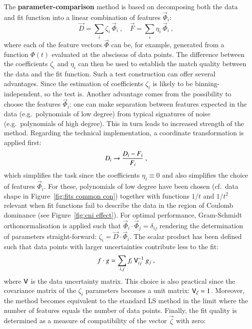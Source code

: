 The {\bf parameter-comparison} method is based on decomposing both the data and fit function into a linear combination of features $\vec\Phi_i$: 
\begin{equation}
\label{eq:parcmp decomposition}
	\vec D = \sum_i \zeta_i\ \vec\Phi_i\ ,\quad
	\vec F = \sum_i \eta_i\ \vec\Phi_i\ ,
\end{equation}
where each of the feature vectors $\vec\Phi$ can be, for example, generated from a function $\Phi(t)$ evaluated at the abscissas of data points. The difference between the coefficients $\zeta_i$ and $\eta_i$ can then be used to establish the match quality between the data and the fit function. Such a test construction can offer several advantages. Since the estimation of coefficients $\zeta_i$ is likely to be binning-independent, so the test is. Another advantage comes from the possibility to choose the features $\vec\Phi_i$: one can make separation between features expected in the data (e.g.~polynomials of low degree) from typical signatures of noise (e.g.~polynomials of high degree). This in turn leads to increased strength of the method. Regarding the technical implementation, a coordinate transformation is applied first:
\begin{equation}
\label{eq:parcmp transform}
	D_i \rightarrow {D_i - F_i\over F_i}\ ,
\end{equation}
which simplifies the task since the coefficients $\eta_i \equiv 0$ and also simplifies the choice of features $\vec\Phi_i$. For these, polynomials of low degree have been chosen (cf.~data shape in Figure~\ref{fig:fits common con}) together with functions $1/t$ and $1/t^2$ relevant when fit functions fail to describe the data in the region of Coulomb dominance (see Figure~\ref{fig:cni effect}). For optimal performance, Gram-Schmidt orthonormalisation is applied such that $\vec\Phi_i \cdot \vec\Phi_j = \delta_{ij}$ rendering the determination of parameters straight-forward: $\zeta_i = \vec D \cdot \vec \Phi_i$. The scalar product has been defined such that data points with larger uncertainties contribute less to the fit:
\begin{equation}
\label{eq:parcmp dot product}
	\vec f \cdot \vec g = \sum_{i, j} f_i\ \mat V^{-1}_{ij}\ g_j \ ,
\end{equation}
where $\mathsf{V}$ is the data uncertainty matrix. This choice is also practical since the covariance matrix of the $\zeta_i$ parameters becomes a unit matrix: $\mathsf{V}_{\zeta} = 1$. Moreover, the method becomes equivalent to the standard LS method in the limit where the number of features equals the number of data points. Finally, the fit quality is determined as a measure of compatibility of the vector $\vec\zeta$ with zero:
